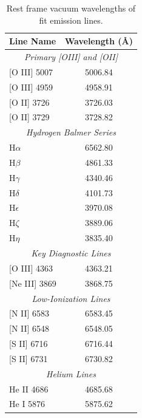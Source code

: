 \documentclass[fleqn,usenatbib]{mnras}
\begin{document}
\begin{table}
	\centering
	\caption{Rest frame vacuum wavelengths of fit emission lines.}
	\label{tab:rest_wavelengths}
	\begin{tabular}{lc}
		\hline
		Line Name & Wavelength (\AA) \\
		\hline
		\multicolumn{2}{c}{\textit{Primary [OIII] and [OII]}} \\
		{[O III]} 5007 & 5006.84 \\
		{[O III]} 4959 & 4958.91 \\
		{[O II]} 3726  & 3726.03 \\
		{[O II]} 3729  & 3728.82 \\
		\multicolumn{2}{c}{\textit{Hydrogen Balmer Series}} \\
		H\(\alpha\)   & 6562.80 \\
		H\(\beta\)    & 4861.33 \\
		H\(\gamma\)   & 4340.46 \\
		H\(\delta\)   & 4101.73 \\
		H\(\epsilon\) & 3970.08 \\
		H\(\zeta\)    & 3889.06 \\
		H\(\eta\)     & 3835.40 \\
		\multicolumn{2}{c}{\textit{Key Diagnostic Lines}} \\
		{[O III]} 4363 & 4363.21 \\
		{[Ne III]} 3869 & 3868.75 \\
		\multicolumn{2}{c}{\textit{Low-Ionization Lines}} \\
		{[N II]} 6583  & 6583.45 \\
		{[N II]} 6548  & 6548.05 \\
		{[S II]} 6716  & 6716.44 \\
		{[S II]} 6731  & 6730.82 \\
		\multicolumn{2}{c}{\textit{Helium Lines}} \\
		{He II} 4686 & 4685.68 \\
		{He I} 5876  & 5875.62 \\
		\hline
	\end{tabular}
\end{table}




\bsp	%
\label{lastpage}
\end{document}

